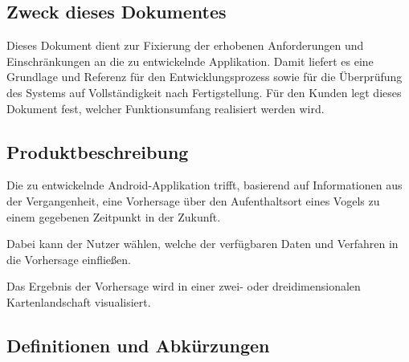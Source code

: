 \documentclass[12pt]{article} %
\begin{document}
\subsection{Zweck dieses Dokumentes}



 Dieses Dokument dient  zur Fixierung der erhobenen Anforderungen und Einschränkungen an die zu entwickelnde Applikation. Damit liefert es eine Grundlage und Referenz für den Entwicklungsprozess sowie für die Überprüfung des Systems auf Vollständigkeit nach Fertigstellung. Für den Kunden legt dieses Dokument fest, welcher Funktionsumfang realisiert werden wird.


\subsection{Produktbeschreibung}

Die zu entwickelnde Android-Applikation trifft, basierend auf Informationen aus der Vergangenheit, eine Vorhersage über den Aufenthaltsort eines Vogels zu einem gegebenen Zeitpunkt in der Zukunft. 

Dabei kann der Nutzer wählen, welche der verfügbaren Daten und Verfahren in die Vorhersage einfließen. 

Das Ergebnis der Vorhersage wird in einer zwei- oder dreidimensionalen Kartenlandschaft visualisiert.



\subsection{Definitionen und Abkürzungen}



 
\end{document}
